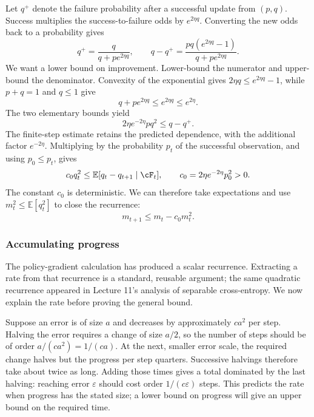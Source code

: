 \documentclass[11pt,twoside]{article}
\newcommand{\E}{\mathbb E}
\theoremstyle{definition}
\theoremstyle{remark}
\begin{document}
Let $q^+$ denote the failure probability after a successful update from
$(p,q)$. Success multiplies the success-to-failure odds by $e^{2\eta q}$.
Converting the new odds back to a probability gives
\begin{equation}
 q^+=\frac{q}{q+pe^{2\eta q}},\qquad
 q-q^+=\frac{pq(e^{2\eta q}-1)}{q+pe^{2\eta q}}.
 \label{eq:finite-progress}
\end{equation}
We want a lower bound on improvement. Lower-bound the numerator and
upper-bound the denominator. Convexity of the exponential gives
$2\eta q\le e^{2\eta q}-1$, while $p+q=1$ and $q\le1$ give
\[
 q+pe^{2\eta q}\le e^{2\eta q}\le e^{2\eta}.
\]
The two elementary bounds yield
\begin{equation}
 2\eta e^{-2\eta}pq^2\le q-q^+.
 \label{eq:success-progress}
\end{equation}
The finite-step estimate retains the predicted dependence, with the
additional factor $e^{-2\eta}$. Multiplying by the probability $p_t$ of the
successful observation, and using $p_0\le p_t$, gives
\begin{equation}
 c_0 q_t^2\le\E[q_t-q_{t+1}\mid\cF_t],
 \qquad c_0=2\eta e^{-2\eta}p_0^2>0.
 \label{eq:binary-drift}
\end{equation}
The constant $c_0$ is deterministic. We can therefore take expectations and
use $m_t^2\le\E[q_t^2]$ to close the recurrence:
\begin{equation}
 m_{t+1}\le m_t-c_0m_t^2.
 \label{eq:quadratic-drift}
\end{equation}

\subsubsection{Accumulating progress}

The policy-gradient calculation has produced a scalar recurrence. Extracting
a rate from that recurrence is a standard, reusable argument; the same
quadratic recurrence appeared in Lecture 11's analysis of separable
cross-entropy. We now explain the rate before proving the general bound.

Suppose an error is of size $a$ and decreases by approximately $ca^2$ per
step. Halving the error requires a change of size $a/2$, so the number of
steps should be of order $a/(ca^2)=1/(ca)$. At the next, smaller error
scale, the required change halves but the progress per step quarters.
Successive halvings therefore take about twice as long. Adding those times
gives a total dominated by the last halving: reaching error $\varepsilon$
should cost order $1/(c\varepsilon)$ steps. This predicts the rate when
progress has the stated size; a lower bound on progress will give an upper
bound on the required time.
\end{document}
